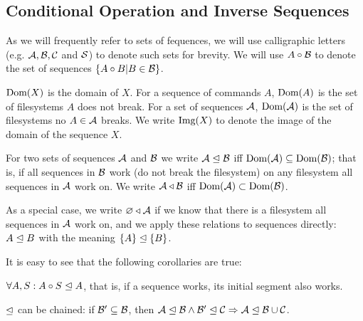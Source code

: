 

\subsection{Conditional Operation and Inverse Sequences}

\begin{mydef}
As we will frequently refer to sets of fequences,
we will use calligraphic letters (e.g. $\mathcal{A, B, C}$ and $\mathcal{S}$)
to denote such sets for brevity.
We will use $A\circ\mathcal{B}$ to denote the set of sequences $\{A\circ B|B\in\mathcal{B}\}$.
\end{mydef}

\begin{mydef}
$\textrm{Dom}({X})$ is the domain of $X$.
For a sequence of commands $A$, $\textrm{Dom}({A})$ is the set of filesystems $A$ does not break.
For a set of sequences $\mathcal{A}$, $\textrm{Dom}({\mathcal{A}})$ is the set of filesystems no $A\in\mathcal{A}$ breaks.
We write $\textrm{Img}({X})$ to denote the image of the domain of the sequence $X$.
\end{mydef}

\begin{mydef}[$\worksmsign$, $\worksmeqsign$]
For two sets of sequences $\mathcal{A}$ and $\mathcal{B}$
we write ${\mathcal{A}}\trianglelefteq{\mathcal{B}}$ iff $\textrm{Dom}({\mathcal{A}}) \subseteq \textrm{Dom}({\mathcal{B}})$;
that is, if all sequences in $\mathcal{B}$ work (do not break the filesystem)
on any filesystem all sequences in $\mathcal{A}$ work on.
We write ${\mathcal{A}}\triangleleft{\mathcal{B}}$ iff $\textrm{Dom}({\mathcal{A}}) \subset \textrm{Dom}({\mathcal{B}})$.

As a special case, we write ${\varnothing}\triangleleft{\mathcal{A}}$ if we know that there is a filesystem
all sequences in $\mathcal{A}$ work on,
and we apply these relations to sequences directly:
${A}\trianglelefteq{B}$ with the meaning ${\{A\}}\trianglelefteq{\{B\}}$.
\end{mydef}

It is easy to see that the following corollaries are true:

\begin{mycor}\label{worksextpostfix}
$\forall A,S: {A\circ S}\trianglelefteq{A}$, that is, if a sequence works, its initial segment also works.
\end{mycor}

\begin{mycor}\label{workschained}
$\worksmeqsign$ can be chained:
if $\mathcal{B'}\subseteq\mathcal{B}$, then
${\mathcal{A}}\trianglelefteq{\mathcal{B}} \wedge {\mathcal{B'}}\trianglelefteq{\mathcal{C}} \Rightarrow {\mathcal{A}}\trianglelefteq{\mathcal{B}\cup\mathcal{C}}$.
\end{mycor}

